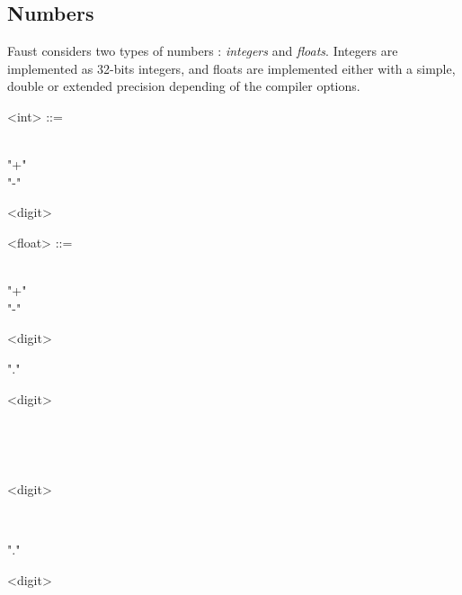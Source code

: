 \documentclass[a4paper]{book}
\begin{document}
\subsection{Numbers}

Faust considers two types of numbers : \textit{integers} and \textit{floats}. Integers are implemented as 32-bits integers, and floats are implemented either with a simple, double or extended precision depending of the compiler options.

\begin{grammar}
  <int> ::= 
  \begin{syntdiag}
    \begin{stack}
      \\ "+" \\ "-"
    \end{stack}
    \begin{rep}
      <digit>
    \end{rep}
  \end{syntdiag}
\end{grammar}

\begin{grammar}
  <float> ::= 
  \begin{syntdiag}
    \begin{stack}
      \\ "+" \\ "-"
    \end{stack}
    \begin{stack}
      \begin{rep}<digit>\end{rep} "." \begin{stack} \begin{rep}<digit>\end{rep} \\ \end{stack} \\
      \begin{stack} \begin{rep}<digit>\end{rep} \\ \end{stack} "." \begin{rep}<digit>\end{rep}
    \end{stack}
  \end{syntdiag}
\end{grammar}
\end{document}
